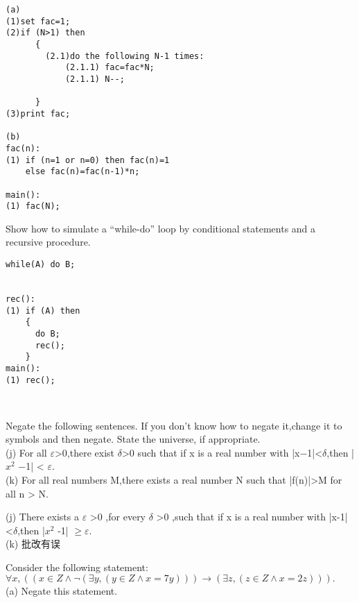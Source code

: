 \documentclass[11pt, a4paper, UTF8]{ctexart}
\begin{document}
\begin{solution}
\begin{verbatim}
(a)
(1)set fac=1;
(2)if (N>1) then
      {
        (2.1)do the following N-1 times:
            (2.1.1) fac=fac*N;
            (2.1.1) N--;

      } 
(3)print fac;

(b)
fac(n):
(1) if (n=1 or n=0) then fac(n)=1
    else fac(n)=fac(n-1)*n;

main():
(1) fac(N);
\end{verbatim}
\end{solution}

\begin{problem}[DH: 2.8]
Show how to simulate a “while-do” loop by conditional statements and a recursive procedure.\\
\end{problem}

\begin{solution}
\begin{verbatim}
while(A) do B;


rec():
(1) if (A) then
    {
      do B;
      rec();
    }
main():
(1) rec();



\end{verbatim}


\end{solution}
\begincorrection	%

\begin{problem}[UD:4.5]
  Negate the following sentences. If you don’t know how to negate it,change it to symbols and then negate. State the universe, if appropriate.\\
  (j) For all $\varepsilon$>0,there exist $\delta$>0 such that if x is a real number with |x−1|<$\delta$,then |$x^2$ −1| < $\varepsilon$.\\
  (k) For all real numbers M,there exists a real number N such that |f(n)|>M for all n > N.
\end{problem}


\begin{revision}
   (j) There exists a $\varepsilon$ >0 ,for every $\delta$ >0 ,such that if x is a real number with |x-1|<$\delta$,then |$x^2$ -1| $\geq \varepsilon$.\\
   (k) 批改有误
\end{revision}

\begin{problem}[UD:4.7]
Consider the following statement:\\
$\forall x,((x  \in  Z \wedge \neg (\exists y,(y \in Z \wedge x = 7y))) \rightarrow (\exists z,(z \in Z \wedge x = 2z))).$\\
(a) Negate this statement.\\
\end{problem}
\end{document}
